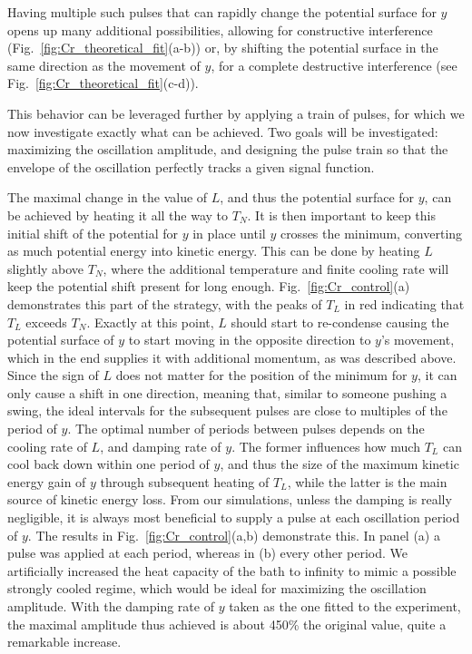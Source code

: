 Having multiple such pulses that can rapidly change the potential surface for $y$ opens up many additional possibilities, allowing for constructive interference (Fig.~\ref{fig:Cr_theoretical_fit}(a-b)) or, by shifting the potential surface in the same direction as the movement of $y$, for a complete destructive interference (see Fig.~\ref{fig:Cr_theoretical_fit}(c-d)).

This behavior can be leveraged further by applying a train of pulses, for which we now investigate exactly what can be achieved.
Two goals will be investigated: maximizing the oscillation amplitude, and designing the pulse train so that the envelope of the oscillation perfectly tracks a given signal function. 

The maximal change in the value of $L$, and thus the potential surface for $y$, can be achieved by heating it all the way to $T_N$.
It is then important to keep this initial shift of the potential for $y$ in place until $y$ crosses the minimum, converting as much potential energy into kinetic energy.
This can be done by heating $L$ slightly above $T_N$, where the additional temperature and finite cooling rate will keep the potential shift present for long enough.
Fig.~\ref{fig:Cr_control}(a) demonstrates this part of the strategy, with the peaks of $T_L$ in red indicating that $T_L$ exceeds $T_N$.
Exactly at this point, $L$ should start to re-condense causing the potential surface of $y$ to start moving in the opposite direction to $y$'s movement, which in the end supplies it with additional momentum, as was described above.
Since the sign of $L$ does not matter for the position of the minimum for $y$, it can only cause a shift in one direction, meaning that, similar to someone pushing a swing, the ideal intervals for the subsequent pulses are close to multiples of the period of $y$.
The optimal number of periods between pulses depends on the cooling rate of $L$, and damping rate of $y$.
The former influences how much $T_L$ can cool back down within one period of $y$, and thus the size of the maximum kinetic energy gain of $y$ through subsequent heating of $T_L$, while the latter is the main source of kinetic energy loss.
From our simulations, unless the damping is really negligible, it is always most beneficial to supply a pulse at each oscillation period of $y$.
The results in Fig.~\ref{fig:Cr_control}(a,b) demonstrate this. In panel (a) a pulse was applied at each  period, whereas in (b) every other period. 
We artificially increased the heat capacity of the bath to infinity to mimic a possible strongly cooled regime, which would be ideal for maximizing the oscillation amplitude.
With the damping rate of $y$ taken as the one fitted to the experiment, the maximal amplitude thus achieved is about 450\% the original value, quite a remarkable increase.  

